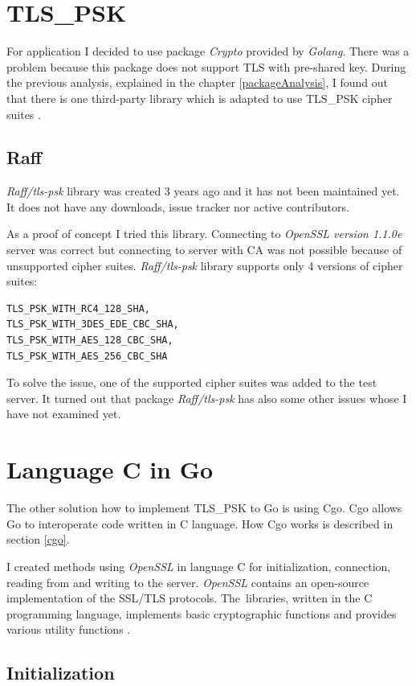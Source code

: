 \documentclass[
  12pt, 
  digital, %
  notable,   %
  nolof,     %
  nolot,     %
]{fithesis3}
\begin{document}
\section{TLS\_PSK}
For application I decided to use package \textit{Crypto} provided by \textit{Golang}. There was a 
problem because this package does not support TLS with pre-shared key. During the previous analysis, 
explained in the chapter \ref{packageAnalysis}, I found out that there is one third-party library 
which is adapted to use TLS\_PSK cipher suites \cite{raff}. 

\subsection{Raff}\label{raff}
\textit{Raff/tls-psk} library was created 3 years ago and it has not been maintained yet. It does 
not have any downloads, issue tracker nor active contributors. 

As a proof of concept I tried this library. Connecting to \textit{OpenSSL version 1.1.0e} 
server was correct but connecting to server with CA was not possible because of unsupported cipher 
suites. \textit{Raff/tls-psk} library supports only 4 versions of cipher suites:
\begin{lstlisting}
TLS_PSK_WITH_RC4_128_SHA,
TLS_PSK_WITH_3DES_EDE_CBC_SHA, 
TLS_PSK_WITH_AES_128_CBC_SHA, 
TLS_PSK_WITH_AES_256_CBC_SHA
\end{lstlisting}

To solve the issue, one of the supported cipher suites was added to the test server. It turned 
out that package \textit{Raff/tls-psk} has also some other issues whose I have not examined yet.

\section{Language C in Go}\label{langCinGo}
The other solution how to implement TLS\_PSK to Go is using Cgo. Cgo allows Go to interoperate code 
written in C language. How Cgo works is described in section \ref{cgo}.

I created methods using \textit{OpenSSL} in language C for initialization, connection, reading 
from and writing to the server. \textit{OpenSSL} contains an open-source implementation of the 
SSL/TLS protocols. The~libraries, written in the C programming language, implements basic 
cryptographic functions and provides various utility functions \cite{foundation}. 

\subsection{Initialization}
\end{document}
